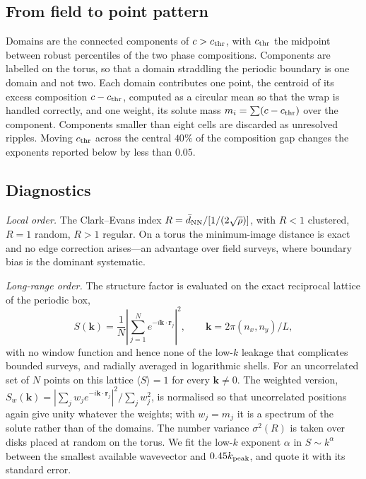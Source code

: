 \documentclass[aps,pre,twocolumn,superscriptaddress,floatfix,longbibliography]{revtex4-2}
\begin{document}
\subsection{From field to point pattern}

Domains are the connected components of $c > c_{\rm thr}$, with $c_{\rm thr}$
the midpoint between robust percentiles of the two phase compositions.
Components are labelled on the torus, so that a domain straddling the periodic
boundary is one domain and not two. Each domain contributes one point, the
centroid of its excess composition $c - c_{\rm thr}$, computed as a circular
mean so that the wrap is handled correctly, and one weight, its solute mass
$m_i = \sum (c - c_{\rm thr})$ over the component. Components smaller than
eight cells are discarded as unresolved ripples. Moving $c_{\rm thr}$ across
the central $40\%$ of the composition gap changes the exponents reported below
by less than $0.05$.

\subsection{Diagnostics}

\emph{Local order.} The Clark--Evans index \cite{ClarkEvans1954}
$R = \bar d_{\rm NN} / [1/(2\sqrt{\rho})]$, with $R < 1$ clustered, $R = 1$
random, $R > 1$ regular. On a torus the minimum-image distance is exact and no
edge correction arises---an advantage over field surveys, where boundary bias
is the dominant systematic.

\emph{Long-range order.} The structure factor is evaluated on the exact
reciprocal lattice of the periodic box,
\begin{equation}
  S(\mathbf{k}) = \frac{1}{N} \left| \sum_{j=1}^{N}
  e^{-i \mathbf{k} \cdot \mathbf{r}_j} \right|^2 ,
  \qquad \mathbf{k} = 2\pi (n_x, n_y)/L ,
\end{equation}
with no window function and hence none of the low-$k$ leakage that
complicates bounded surveys, and radially averaged in logarithmic shells. For
an uncorrelated set of $N$ points on this lattice $\langle S \rangle = 1$ for
every $\mathbf{k} \neq 0$. The weighted version,
$S_w(\mathbf{k}) = |\sum_j w_j e^{-i\mathbf{k}\cdot\mathbf{r}_j}|^2 /
\sum_j w_j^2$, is normalised so that uncorrelated positions again give unity
whatever the weights; with $w_j = m_j$ it is a spectrum of the solute rather
than of the domains. The number variance $\sigma^2(R)$ is taken over disks
placed at random on the torus. We fit the low-$k$ exponent $\alpha$ in
$S \sim k^{\alpha}$ between the smallest available wavevector and
$0.45 k_{\rm peak}$, and quote it with its standard error.
\end{document}
